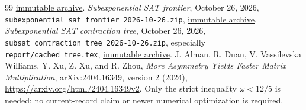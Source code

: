 \documentclass[11pt]{article}
\theoremstyle{remark}\newtheorem{remark}[theorem]{Remark}
\begin{document}
\begin{thebibliography}{99}
\href{https://github.com/VladimirReshetnikov/ProveIt/blob/fa6e904d109b738154db7fe41e7f2777e6d24aee/docs/incoming/sat_adaptive_contraction_2026-10-26.zip}{immutable archive}.
 \emph{Subexponential SAT frontier}, October 26, 2026,
\texttt{subexponential\_sat\_frontier\_2026-10-26.zip},
\href{https://github.com/VladimirReshetnikov/ProveIt/blob/fa6e904d109b738154db7fe41e7f2777e6d24aee/docs/incoming/subexponential_sat_frontier_2026-10-26.zip}{immutable archive}.
 \emph{Subexponential SAT contraction tree}, October 26, 2026,
\texttt{subsat\_contraction\_tree\_2026-10-26.zip}, especially
\texttt{report/cached\_tree.tex},
\href{https://github.com/VladimirReshetnikov/ProveIt/blob/fa6e904d109b738154db7fe41e7f2777e6d24aee/docs/incoming/subsat_contraction_tree_2026-10-26.zip}{immutable archive}.
 J. Alman, R. Duan, V. Vassilevska Williams, Y. Xu, Z. Xu,
and R. Zhou, \emph{More Asymmetry Yields Faster Matrix Multiplication},
arXiv:2404.16349, version 2 (2024),
\url{https://arxiv.org/html/2404.16349v2}.
Only the strict inequality $\omega<12/5$ is needed; no current-record
claim or newer numerical optimization is required.
\end{thebibliography}
\end{document}
